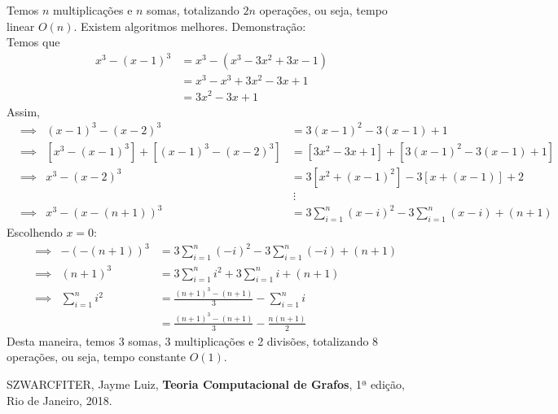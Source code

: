 \documentclass{homework}
\begin{document}
	
	\subsubquest Temos $n$ multiplicações e $n$ somas, totalizando $2n$ operações, ou seja, tempo linear $O(n)$.
	\subsubquest Existem algoritmos melhores. Demonstração:\\
	Temos que
	\begin{align*}
		x^3 - (x-1)^3 &= x^3 - (x^3 - 3x^2 + 3x - 1)\\
					  &= x^3 - x^3 + 3x^2 - 3x + 1\\
					  &= 3x^2 - 3x + 1
	\end{align*}
	Assim,
	\begin{align*}
		&\implies& (x-1)^3 - (x-2)^3 &= 3(x-1)^2 - 3(x-1) + 1\\
		&\implies& [x^3 - (x-1)^3] + [(x-1)^3 - (x-2)^3] &= [3x^2 - 3x + 1] + [3(x-1)^2 - 3(x-1) + 1]\\
		&\implies& x^3 - (x-2)^3 &= 3[x^2 + (x-1)^2] - 3[x + (x-1)] + 2\\
		& & &~\vdots\\
		&\implies& x^3 - (x-(n+1))^3 &= 3\sum_{i=1}^{n}(x-i)^2 - 3\sum_{i=1}^n(x-i) + (n+1)
	\end{align*}
	Escolhendo $x = 0$:
	\begin{align*}
	&\implies& -(-(n+1))^3 &= 3\sum_{i=1}^{n}(-i)^2 - 3\sum_{i=1}^n(-i) + (n+1)\\
	&\implies&     (n+1)^3 &= 3\sum_{i=1}^{n} i^2 + 3\sum_{i=1}^n i + (n+1)\\
	&\implies& \sum_{i=1}^{n} i^2 &= \frac{(n+1)^3 - (n+1)}{3} - \sum_{i=1}^n i\\
	&        &					  &= \frac{(n+1)^3 - (n+1)}{3} - \frac{n (n+1)}{2}
	\end{align*}
	Desta maneira, temos 3 somas, 3 multiplicações e 2 divisões, totalizando 8 operações, ou seja, tempo constante $O(1)$.
	
	\begin{thebibliography}{10}
		 SZWARCFITER, Jayme Luiz, \textbf{Teoria Computacional de Grafos}, 1ª edição, Rio de Janeiro, 2018.
	\end{thebibliography}
\end{document}
